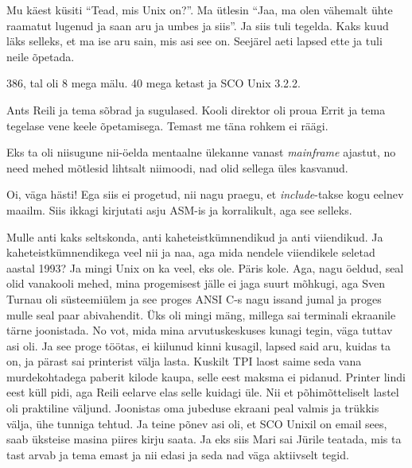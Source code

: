 Mu käest küsiti \enquote{Tead, mis Unix on?}. Ma ütlesin \enquote{Jaa, ma olen vähemalt ühte raamatut lugenud ja saan aru ja umbes ja siis}. Ja siis tuli tegelda. Kaks kuud läks selleks, et ma ise aru sain, mis asi see on. Seejärel aeti lapsed ette ja tuli neile õpetada.


386, tal oli 8 mega mälu. 40 mega ketast ja SCO Unix 3.2.2. 


Ants Reili ja tema sõbrad ja sugulased. Kooli direktor oli proua Errit ja tema tegelase vene keele õpetamisega. Temast me täna rohkem ei räägi. 

Eks  ta oli niisugune nii-öelda mentaalne ülekanne vanast \emph{mainframe} ajastut, no need mehed mõtlesid lihtsalt niimoodi, nad olid sellega üles kasvanud. 


Oi, väga hästi! Ega siis ei progetud, nii nagu praegu, et \emph{include}-takse kogu eelnev maailm. Siis ikkagi kirjutati asju ASM-is ja korralikult, aga see selleks. 

Mulle anti kaks seltskonda, anti kaheteistkümnendikud ja anti viiendikud. Ja kaheteistkümnendikega veel nii ja naa, aga mida  nendele viiendikele seletad aastal 1993? Ja  mingi Unix on ka veel, eks ole. Päris kole. Aga, nagu öeldud, seal olid vanakooli mehed, mina progemisest jälle ei jaga suurt mõhkugi, aga Sven Turnau oli  süsteemiülem ja see proges ANSI C-s nagu issand jumal ja proges mulle seal paar abivahendit. Üks oli mingi mäng, millega sai terminali ekraanile tärne joonistada. No vot, mida mina arvutuskeskuses kunagi tegin, väga tuttav asi oli. Ja see proge töötas, ei kiilunud kinni kusagil, lapsed said aru, kuidas ta on, ja pärast sai printerist välja lasta. Kuskilt TPI laost saime seda vana murdekohtadega paberit kilode kaupa, selle eest maksma ei pidanud. Printer lindi eest küll pidi, aga Reili eelarve elas selle kuidagi  üle. Nii et põhimõtteliselt lastel oli praktiline väljund. Joonistas oma jubeduse  ekraani peal valmis ja trükkis välja, ühe tunniga tehtud. Ja teine põnev asi oli, et SCO Unixil on email sees, saab üksteise masina piires kirju saata. Ja eks siis Mari sai Jürile teatada, mis ta tast arvab ja tema emast ja nii edasi ja seda nad väga aktiivselt tegid. 

